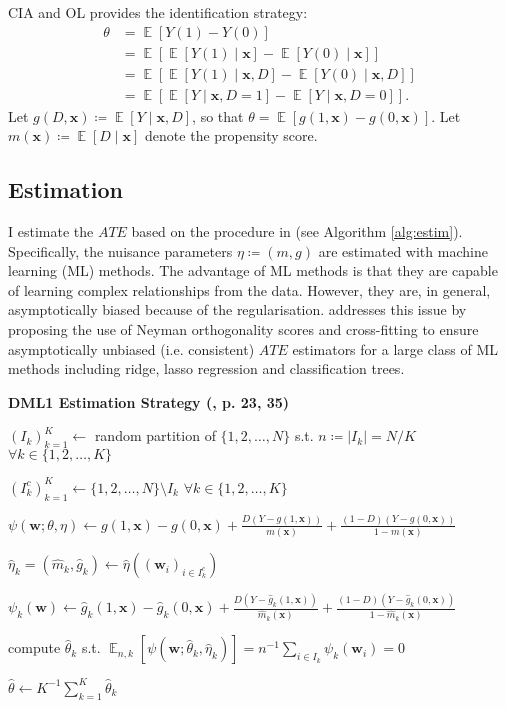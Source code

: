 \documentclass[a4paper,12pt]{article}
\DeclareMathOperator*{\E}{\mathbb{E}}
\newcommand{\Eb}[1]{\E\left[#1\right]}
\newcommand{\Ebs}[2]{{\E}_{#1}\left[#2\right]}
\newcommand{\ceq}{\coloneqq}  %
\begin{document}
\noindent CIA and OL provides the identification strategy:
\begin{align*}
\theta &= \Eb{Y(1)-Y(0)} \\
	&= \Eb{\Eb{Y(1)\mid \bm{x}}-\Eb{Y(0)\mid \bm{x}}}  \\
	&=\Eb{\Eb{Y(1)\mid \bm{x}, D}-\Eb{Y(0)\mid \bm{x}, D}}  \\
	&=\Eb{\Eb{Y\mid \bm{x}, D=1}-\Eb{Y\mid \bm{x}, D=0}}.
\end{align*}
Let $g(D, \bm{x})\ceq\Eb{Y\mid \bm{x}, D}$, so that $\theta=\Eb{g(1, \bm{x})-g( 0, \bm{x})}$. Let $m(\bm{x})\ceq \Eb{D\mid\bm{x}}$ denote the propensity score.

\subsection{Estimation}

I estimate the $ATE$ based on the procedure in \cite{chernozhukov2016} (see Algorithm \ref{alg:estim}). Specifically, the nuisance parameters $\eta\ceq (m, g)$ are estimated with machine learning (ML) methods. The advantage of ML methods is that they are capable of learning complex relationships from the data. However, they are, in general, asymptotically biased because of the regularisation.  \cite{chernozhukov2016} addresses this issue by proposing the use of Neyman orthogonality scores and cross-fitting to ensure asymptotically unbiased (i.e. consistent) $ATE$ estimators for a large class of ML methods including ridge, lasso regression and classification trees.

\begin{algorithm}[H]
\caption{\textbf{DML1 Estimation Strategy (\cite{chernozhukov2016}, p. 23, 35)}}\label{alg:estim}
{\small
\begin{algorithmic}[1]

\State $(I_k)_{k=1}^K\gets$ random partition of $\{1,2,\ldots,N\}$ s.t. $n\ceq |I_k|=N/K$ $\forall k\in\{1,2,\ldots,K\}$

\State  $(I_k^c)_{k=1}^K\gets\{1,2,\ldots,N\}\setminus I_k$ $\forall k\in\{1,2,\ldots,K\}$

\State $\psi(\bm{w}; \theta, \eta)\gets g(1, \bm{x})-g(0, \bm{x})+\frac{D(Y-g(1,\bm{x}))}{m(\bm{x})}+\frac{(1-D)(Y-g(0,\bm{x}))}{1-m(\bm{x})}$ 


	\State $\hat{\eta}_k = (\hat{m}_k, \hat{g}_k) \gets \hat{\eta}((\bm{w}_i)_{i\in I_k^c})$ 
	
	\State $\psi_k(\bm{w})\gets \hat{g}_k(1, \bm{x})-\hat{g}_k(0, \bm{x})+\frac{D(Y-\hat{g}_k(1,\bm{x}))}{\hat{m}_k(\bm{x})}+\frac{(1-D)(Y-\hat{g}_k(0,\bm{x}))}{1-\hat{m}_k(\bm{x})}$	

	\State compute $\hat{\theta}_k$ s.t. $\Ebs{n,k}{\psi(\bm{w}; \hat{\theta}_k, \hat{\eta}_k)}={n}^{-1}\sum_{i\in I_k}\psi_k(\bm{w}_i)=0$
\EndFor

\State $\hat{\theta}\gets {K}^{-1}\sum_{k=1}^K\hat{\theta}_k$
\State \Return {$\hat{\theta}$}
\end{algorithmic}
}
\end{algorithm}
\end{document}
